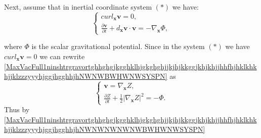 \documentclass{article}
\theoremstyle{definition}
\theoremstyle{remark}
\renewcommand{\vec}[1]{\mathbf{#1}}
\newcommand{\er}{\eqref}
\newcommand{\er}{\eqref}
\begin{document}
Next, assume that in inertial coordinate system $(*)$ we have:
\begin{equation}
\label{MaxVacFull1ninshtrgravortghhghgjkgghklhjgkghghjjkjhjkkggjkhjkhjjhhfhjhklkhkhjjklzzzyyyhjggjhgghhjhNWNWBWHWNWSYSPN}
\begin{cases}
curl_{\vec x}\vec v= 0,\\
\frac{\partial\vec v}{\partial t}+d_\vec x\vec v\cdot\vec v=
-\nabla_{\vec x}\Phi,
\end{cases}
\end{equation}
%
%
%
\begin{comment}
\begin{equation}
\label{MaxVacFull1ninshtrgravortghhghgjkgghklhjgkghghjjkjhjkkggjkhjkhjjhhfhjhklkhkhjjklzzzyyyhjggjhgghhjhNWBWHWNWSYSPN}
\begin{cases}
curl_{\vec x}\vec v= 0,\\
div_{\vec x}\left\{\frac{\partial\vec v}{\partial t}+d_\vec x\vec
v\cdot\vec v\right\}= -\Delta_{\vec x}\Phi,
\end{cases}
\end{equation}
We can rewrite
\er{MaxVacFull1ninshtrgravortghhghgjkgghklhjgkghghjjkjhjkkggjkhjkhjjhhfhjhklkhkhjjklzzzyyyhjggjhgghhjhNWBWHWNWSYSPN}
as
\end{comment}
%
%
%
where $\Phi$ is the scalar gravitational potential. Since in the
system $(*)$ we have $curl_{\vec x}\vec v=0$ we can rewrite
\er{MaxVacFull1ninshtrgravortghhghgjkgghklhjgkghghjjkjhjkkggjkhjkhjjhhfhjhklkhkhjjklzzzyyyhjggjhgghhjhNWNWBWHWNWSYSPN}
as
\begin{equation}
\label{MaxVacFull1ninshtrgravortghhghgjkgghklhjgkghghjjkjhjkkggjkhjkhjjhhfhjhklkhkhjjklzzzyyyhjggjhgghhjhNWNWNWNWNWBWHWNWSYSPN}
\begin{cases}
\vec v=\nabla_{\vec x}Z,\\
\frac{\partial Z}{\partial t}+\frac{1}{2}\left|\nabla_{\vec
x}Z\right|^2=-\Phi.
\end{cases}
\end{equation}
Thus by
\er{MaxVacFull1ninshtrgravortghhghgjkgghklhjgkghghjjkjhjkkggjkhjkhjjhhfhjhklkhkhjjklzzzyyyhjggjhgghhjhNWNWNWNWNWBWHWNWSYSPN}
\end{document}
